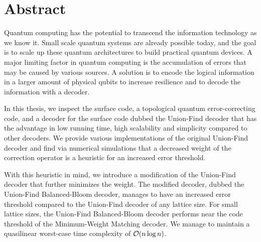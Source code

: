 \chapter*{Abstract}

Quantum computing has the potential to transcend the information technology as we know it. Small scale quantum systems are already possible today, and the goal is to scale up these quantum architectures to build practical quantum devices. A major limiting factor in quantum computing is the accumulation of errors that may be caused by various sources. A solution is to encode the logical information in a larger amount of physical qubits to increase resilience and to decode the information with a decoder. 

In this thesis, we inspect the surface code, a topological quantum error-correcting code, and a decoder for the surface code dubbed the Union-Find decoder that has the advantage in low running time, high scalability and simplicity compared to other decoders. We provide various implementations of the original Union-Find decoder and find via numerical simulations that a decreased weight of the correction operator is a heuristic for an increased error threshold. 

With this heuristic in mind, we introduce a modification of the Union-Find decoder that further minimizes the weight. The modified decoder, dubbed the Union-Find Balanced-Bloom decoder, manages to have an increased error threshold compared to the Union-Find decoder of any lattice size. For small lattice sizes, the Union-Find Balanced-Bloom decoder performs near the code threshold of the Minimum-Weight Matching decoder. We manage to maintain a quasilinear worst-case time complexity of $\mathcal{O}(n\log{n})$. 